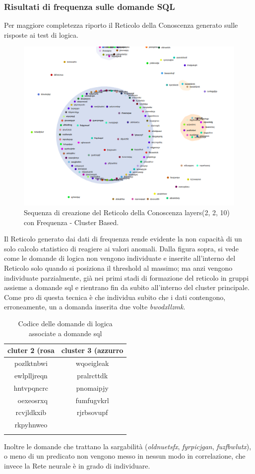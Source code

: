 \subsubsection{Risultati di frequenza sulle domande SQL}
\label{Risultati di frequenza sulle domande SQL}
Per maggiore completezza riporto il Reticolo della Conoscenza generato sulle risposte ai test di logica.
\begin{figure}[H]
\centering
	\includegraphics[width=0.70\linewidth]{./image/frequence-sql(2,2,10).png}
	\caption{Sequenza di creazione del Reticolo della Conoscenza layers(2, 2, 10) con Frequenza - Cluster Based.}
	\label{Sequenza di creazione del Reticolo della Conoscenza layers(2, 2, 10) con Frequenza - Cluster Based.}
\end{figure}
\noindent
Il Reticolo generato dai dati di frequenza rende evidente la non capacità di un solo calcolo statistico di reagiere ai valori anomali. Dalla figura sopra, si vede come  le domande di logica non vengono individuate e inserite all'interno del Reticolo solo quando si posiziona il threshold al massimo; ma anzi vengono individuate parzialmente, già nei primi stadi di formazione del reticolo in gruppi assieme a domande sql e rientrano fin da subito all'interno del cluster principale.\\
\noindent
Come pro di questa tecnica è che individua subito che i dati contengono, erroneamente, un a domanda inserita due volte \textit{bwodxllzmk}.

\begin{longtable}{|c|c|}
	\hline
	\textbf{cluter 2 (rosa} & \textbf{cluster 3 (azzurro} \\\hline\hline
	pozlktnbwi & wqoeigleak \\
	ewlplljreqn & pralrcttdk \\
	hntvpqncrc & pnomaipjy \\\
	oexeosrxq & fumfugvkrl \\
	rcvjldkxib & rjrbsovupf \\
    rkpyhnweo \\
\hline	
\caption{Codice delle domande di logica associate a domande sql}\label{tab:Codice delle domande di logica associate a domande sql}
\end{longtable}
\noindent
Inoltre le domande che trattano la sargabilità  (\textit{oldnuetsfx}, \textit{fyrpicjgan}, \textit{fuzfbwlutx}), o meno di un predicato non vengono messo in nessun modo in correlazione, che invece la Rete neurale è in grado di individuare.
	
	









